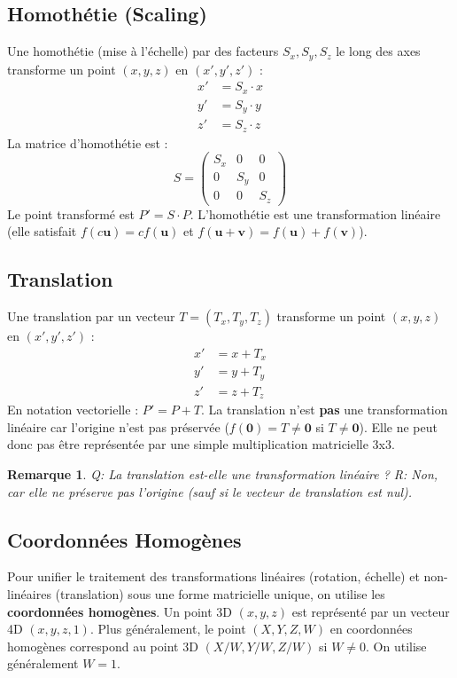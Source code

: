 \documentclass{article}
\newtheorem{remark}{Remarque}
\begin{document}
\subsection{Homothétie (Scaling)}
Une homothétie (mise à l'échelle) par des facteurs $S_x, S_y, S_z$ le long des axes transforme un point $(x, y, z)$ en $(x', y', z')$ :
\begin{align*} x' &= S_x \cdot x \\ y' &= S_y \cdot y \\ z' &= S_z \cdot z \end{align*}
La matrice d'homothétie est :
\[ S = \begin{pmatrix} S_x & 0 & 0 \\ 0 & S_y & 0 \\ 0 & 0 & S_z \end{pmatrix} \]
Le point transformé est $P' = S \cdot P$. L'homothétie est une transformation linéaire (elle satisfait $f(c\mathbf{u}) = cf(\mathbf{u})$ et $f(\mathbf{u} + \mathbf{v}) = f(\mathbf{u}) + f(\mathbf{v})$).

\subsection{Translation}
Une translation par un vecteur $T = (T_x, T_y, T_z)$ transforme un point $(x, y, z)$ en $(x', y', z')$ :
\begin{align*} x' &= x + T_x \\ y' &= y + T_y \\ z' &= z + T_z \end{align*}
En notation vectorielle : $P' = P + T$.
La translation n'est \textbf{pas} une transformation linéaire car l'origine n'est pas préservée ($f(\mathbf{0}) = T \neq \mathbf{0}$ si $T \neq \mathbf{0}$). Elle ne peut donc pas être représentée par une simple multiplication matricielle 3x3.

\begin{remark}
Q: La translation est-elle une transformation linéaire ?
R: Non, car elle ne préserve pas l'origine (sauf si le vecteur de translation est nul).
\end{remark}

\subsection{Coordonnées Homogènes}
Pour unifier le traitement des transformations linéaires (rotation, échelle) et non-linéaires (translation) sous une forme matricielle unique, on utilise les \textbf{coordonnées homogènes}.
Un point 3D $(x, y, z)$ est représenté par un vecteur 4D $(x, y, z, 1)$. Plus généralement, le point $(X, Y, Z, W)$ en coordonnées homogènes correspond au point 3D $(X/W, Y/W, Z/W)$ si $W \neq 0$. On utilise généralement $W=1$.
\end{document}
